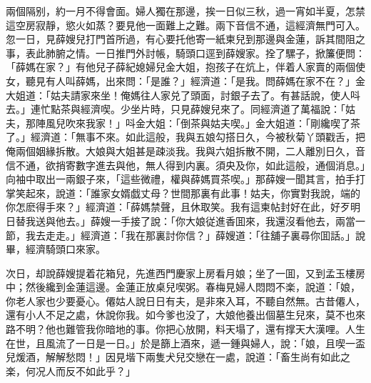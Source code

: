 兩個隔别，約一月不得會面。婦人獨在那邊，挨一日似三秋，過一宵如半夏，怎禁這空房寂靜，慾火如蒸？要見他一面難上之難。兩下音信不通，這經濟無門可入。忽一日，見薛嫂兒打門首所過，有心要托他寄一紙柬兒到那邊與金蓮，訴其間阻之事，表此肺腑之情。一日推門外討帳，騎頭口逕到薛嫂家。拴了騾子，掀簾便問：「薛媽在家？」有他兒子薛紀媳婦兒金大姐，抱孩子在炕上，伴着人家賣的兩個使女，聽見有人叫薛媽，出來問：「是誰？」經濟道：「是我。問薛媽在家不在？」金大姐道：「姑夫請家來坐！俺媽往人家兑了頭面，討銀子去了。有甚話說，使人呌去。」連忙點茶與經濟喫。少坐片時，只見薛嫂兒來了。同經濟道了萬福說：「姑夫，那陣風兒吹來我家！」呌金大姐：「倒茶與姑夫喫。」金大姐道：「剛纔喫了茶了。」經濟道：「無事不來。如此這般，我與五娘勾搭日久，今被秋菊丫頭戳舌，把俺兩個姻緣拆散。大娘與大姐甚是疎淡我。我與六姐拆散不開，二人離別日久，音信不通，欲捎寄數字進去與他，無人得到内裏。須央及你，如此這般，通個消息。」向袖中取出一兩銀子來，「這些微禮，權與薛媽買茶喫。」那薛嫂一聞其言，拍手打掌笑起來，說道：「誰家女婿戯丈母？世間那裏有此事！姑夫，你實對我說，端的你怎麽得手來？」經濟道：「薛媽禁聲，且休取笑。我有這柬帖封好在此，好歹明日替我送與他去。」薛嫂一手接了說：「你大娘従進香囬來，我還沒看他去，兩當一節，我去走走。」經濟道：「我在那裏討你信？」薛嫂道：「往舖子裏尋你囬話。」說畢，經濟騎頭口來家。

次日，却說薛嫂提着花箱兒，先進西門慶家上房看月娘；坐了一囬，又到孟玉樓房中；然後纔到金蓮這邊。金蓮正放桌兒喫粥。春梅見婦人悶悶不楽，說道：「娘，你老人家也少要憂心。僊姑人說日日有夫，是非來入耳，不聽自然無。古昔僊人，還有小人不足之處，休說你我。如今爹也没了，大娘他養出個墓生兒來，莫不也來路不明？他也難管我你暗地的事。你把心放開，料天塌了，還有撑天大漢哩。人生在世，且風流了一日是一日。」於是篩上酒來，遞一鍾與婦人，說：「娘，且喫一盃兒煖酒，解解愁悶！」因見堦下兩隻犬兒交戀在一處，說道：「畜生尚有如此之楽，何况人而反不如此乎？」

